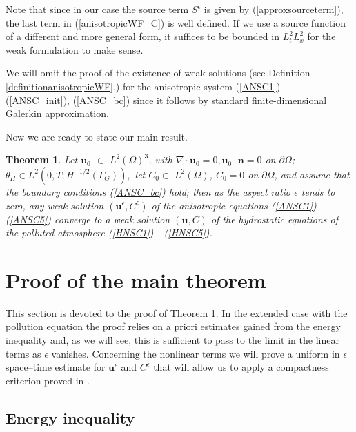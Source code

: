 \documentclass[11pt]{article}
\newtheorem{theorem}{Theorem}
\begin{document}
Note that since in our case the source term $S^\epsilon$ is given by (\ref{approxsourceterm}), the last term in (\ref{anisotropicWF_C}) is well defined. If we use a source function of a different and more general form, it suffices to be bounded in $L_t^2 L_x^2$ for the weak formulation to make sense.

We will omit the proof of the existence of weak solutions (see Definition \ref{definitionanisotropicWF}.) for the anisotropic system (\ref{ANSC1}) - (\ref{ANSC_init}), (\ref{ANSC_bc}) since it follows by standard finite-dimensional Galerkin approximation.

Now we are ready to state our main result.

\begin{theorem} \label{maintheorem}
Let $\mathbf{u}_0$ $\in$ $L^2 (\Omega)^3$, with $\nabla \cdot \mathbf{u}_0 = 0, \mathbf{u}_0 \cdot \mathbf{n} = 0$ on $\partial \Omega$; $\theta_H \in L^2(0,T; H^{-1/2}(\Gamma_G)),$ let $C_0 \in$ $L^2 (\Omega)$, $C_0 = 0$ on $ \partial \Omega$, and assume that the boundary conditions (\ref{ANSC_bc}) hold; then as the aspect ratio $\epsilon$ tends to zero, any weak solution $(\mathbf{u}^\epsilon, C^\epsilon)$ of the anisotropic equations (\ref{ANSC1}) - (\ref{ANSC5}) converge to a weak solution $(\mathbf{u}, C)$ of the hydrostatic equations of the polluted atmosphere (\ref{HNSC1}) - (\ref{HNSC5}).
\end{theorem}

\section{Proof of the main theorem} \label{proof}
 
This section is devoted to the proof of Theorem \ref{maintheorem}. In the extended case with the pollution equation the proof relies on a priori estimates gained from the energy inequality and, as we will see, this is sufficient to pass to the limit in the linear terms as $\epsilon$ vanishes. Concerning the nonlinear terms we will prove a uniform in $\epsilon$ space--time estimate for $\mathbf{u}^\epsilon$ and $C^\epsilon$ that will allow us to apply a compactness criterion proved in \cite{azerad2001mathematical}.

\subsection{Energy inequality}
\end{document}
